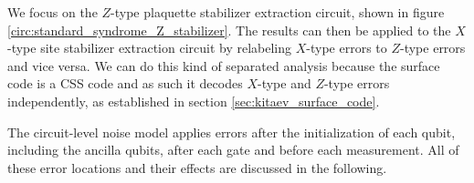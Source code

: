 We focus on the $Z$-type plaquette stabilizer extraction circuit, shown in figure \ref{circ:standard_syndrome_Z_stabilizer}.
The results can then be applied to the $X$-type site stabilizer extraction circuit by relabeling $X$-type errors to $Z$-type errors and vice versa.
We can do this kind of separated analysis because the surface code is a CSS code and as such it decodes $X$-type and $Z$-type errors independently, 
as established in section \ref{sec:kitaev_surface_code}.

The circuit-level noise model applies errors after the initialization of each qubit, including the ancilla qubits, after each gate and before each measurement.
All of these error locations and their effects are discussed in the following.

